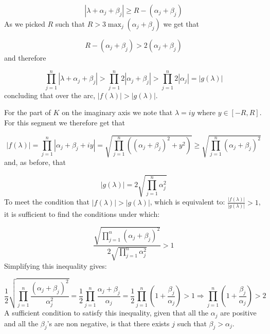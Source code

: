   \begin{equation*}
      |\lambda+\alpha_j+\beta_j| \geq R-(\alpha_j+\beta_j)
  \end{equation*}
  As we picked $R$ such that $R>3\max_j(\alpha_j+\beta_j)$ we get that 

  \begin{equation*}
      R-(\alpha_j+\beta_j)>2(\alpha_j+\beta_j)
  \end{equation*}
  and therefore 

  \begin{equation*}
      \prod_{j=1}^n|\lambda+\alpha_j+\beta_j|>\prod_{j=1}^n2|\alpha_j+\beta_j|>\prod_{j=1}^n2|\alpha_j| = |g(\lambda)|
  \end{equation*}
  concluding that over the arc, $|f(\lambda)|>|g(\lambda)|$.

  For the part of $K$ on the imaginary axis we note that $\lambda=iy$ where $y\in[-R,R]$.
For this segment we therefore get that

\begin{equation*}
    |f(\lambda)|=\prod_{j=1}^n|\alpha_j+\beta_j+iy|=\sqrt{\prod_{j=1}^n((\alpha_j+\beta_j)^2+y^2)} \geq \sqrt{\prod_{j=1}^n(\alpha_j+\beta_j)^2}
 \end{equation*} 
 and, as before, that

 \begin{equation*}
     |g(\lambda)|=2\sqrt{\prod_{j=1}^n\alpha_j^2}
 \end{equation*}
 To meet the condition that $|f(\lambda)|>|g(\lambda)|$, which is equivalent to: $\frac{|f(\lambda)|}{|g(\lambda)|}>1$, it is sufficient to find the conditions under which:

 \begin{equation*}
   \frac{\sqrt{\prod_{j=1}^n(\alpha_j+\beta_j)^2}}{2\sqrt{\prod_{j=1}^n\alpha_j^2}}>1
 \end{equation*}
 Simplifying this inequality gives:

 \begin{equation*}
     \frac{1}{2}\sqrt{\prod_{j=1}^n\frac{(\alpha_j+\beta_j)^2}{\alpha_j^2}}= \frac{1}{2}\prod_{j=1}^n\frac{\alpha_j+\beta_j}{\alpha_j}= \frac{1}{2}\prod_{j=1}^n(1+\frac{\beta_j}{\alpha_j})>1 \Rightarrow \prod_{j=1}^n(1+\frac{\beta_j}{\alpha_j})>2
 \end{equation*}
 A sufficient condition to satisfy this inequality, given that all the $\alpha_j$ are positive and all the $\beta_j$'s are non negative, is that there exists $j$ such that $\beta_j > \alpha_j$.

